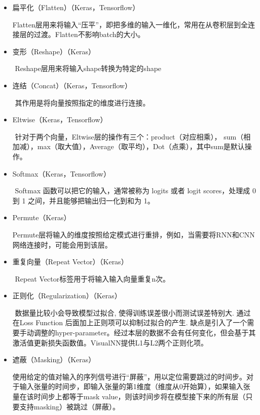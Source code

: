 \documentclass{progbookcn}
\begin{document}
\begin{itemize}
\item 扁平化（Flatten）（Keras，Tensorflow）

  ​	Flatten层用来将输入“压平”，即把多维的输入一维化，常用在从卷积层到全连接层的过渡。Flatten不影响batch的大小。

\item 变形（Reshape）（Keras）

  ​	Reshape层用来将输入shape转换为特定的shape

\item 连结（Concat）（Keras，Tensorflow）

  ​	其作用是将向量按照指定的维度进行连接。

\item Eltwise（Keras，Tensorflow）

  ​	针对于两个向量，Eltwise层的操作有三个：product（对应相乘）， sum（相加减），max（取大值），Average（取平均），Dot（点乘），其中sum是默认操作。

\item Softmax（Keras，Tensorflow）

  ​	Softmax 函数可以把它的输入，通常被称为 logits 或者 logit scores，处理成 0 到 1 之间，并且能够把输出归一化到和为 1。

\item Permute（Keras）

  ​	Permute层将输入的维度按照给定模式进行重排，例如，当需要将RNN和CNN网络连接时，可能会用到该层。

\item 重复向量（Repeat Vector）（Keras）

  ​	Repeat Vector标签用于将输入输入向量重复n次。

\item 正则化（Regularization）（Keras）

  ​	数据量比较小会导致模型过拟合, 使得训练误差很小而测试误差特别大. 通过在Loss Function 后面加上正则项可以抑制过拟合的产生. 缺点是引入了一个需要手动调整的hyper-parameter。经过本层的数据不会有任何变化，但会基于其激活值更新损失函数值。VisualNN提供L1与L2两个正则化项。

\item 遮蔽（Masking）（Keras）

  ​	使用给定的值对输入的序列信号进行“屏蔽”，用以定位需要跳过的时间步。对于输入张量的时间步，即输入张量的第1维度（维度从0开始算），如果输入张量在该时间步上都等于mask value，则该时间步将在模型接下来的所有层（只要支持masking）被跳过（屏蔽）。

\end{itemize}
\end{document}
